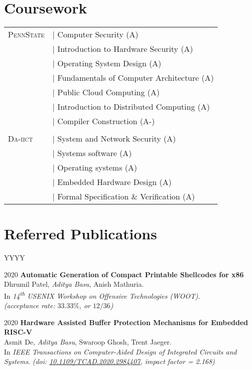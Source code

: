\documentclass[margin]{res}
\newcommand{\daiict}{\textsc{Da-iict}}
\newcommand{\psu}{\textsc{PennState}}
\newcommand{\doi}[1]{\href{http://dx.doi.org/#1}{#1}}
\begin{document}
\begin{resume}
\section{Coursework}
\begin{tabular}{l p{3in}}
\psu        & $\vert$ Computer Security (A)\\
            & $\vert$ Introduction to Hardware Security (A)\\
            & $\vert$ Operating System Design (A)\\
            & $\vert$ Fundamentals of Computer Architecture (A)\\
            & $\vert$ Public Cloud Computing (A)\\
            & $\vert$ Introduction to Distributed Computing (A)\\
            & $\vert$ Compiler Construction (A-)\\
\\
\daiict     & $\vert$ System and Network Security (A)\\
            & $\vert$ Systems software (A)\\
            & $\vert$ Operating systems (A)\\
            & $\vert$ Embedded Hardware Design (A)\\
            & $\vert$ Formal Specification \& Verification (A)
\end{tabular}

\section{Referred Publications}

\begin{labeling}{YYYY}
\item[2020]
    \textbf{Automatic Generation of Compact Printable Shellcodes for x86}\\
    Dhrumil Patel, \emph{Aditya Basu}, Anish Mathuria.\\
    In \emph{14\textsuperscript{th} USENIX Workshop on Offensive Technologies ({WOOT})}.\\
    {\itshape (acceptance rate: $33.33\%$, or $12/36$)}

\item[2020]
    \textbf{Hardware Assisted Buffer Protection Mechanisms for Embedded RISC-V}\\
    Asmit De, \emph{Aditya Basu}, Swaroop Ghosh, Trent Jaeger.\\
    In \emph{IEEE Transactions on Computer-Aided Design of Integrated Circuits and Systems}.
    {\itshape (doi: \doi{10.1109/TCAD.2020.2984407}, impact factor = 2.168)}


\end{labeling}
\end{resume}
\end{document}
